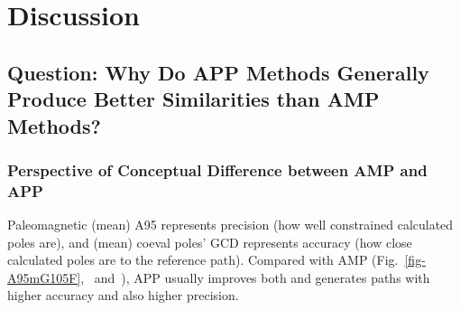 \begin{landscape}
\begin{table}[]
{\begin{tabular}{@{}clllllcccccccc@{}}
 &  &  &  &  &  &  &  &  &  &  &  &  &  \\ \bottomrule
\end{tabular}%
}
\end{table}
\end{landscape}

\section{Discussion}

\subsection{Question: Why Do APP Methods Generally Produce Better Similarities
than AMP Methods?}

\subsubsection{Perspective of Conceptual Difference between AMP and APP}

Paleomagnetic (mean) A95 represents precision (how well constrained calculated
poles are), and (mean) coeval poles' GCD represents accuracy (how close
calculated poles are to the reference path). Compared with AMP
(Fig.~\ref{fig-A95mG105F},~
and~), APP usually improves both and generates paths
with higher accuracy and also higher precision.

